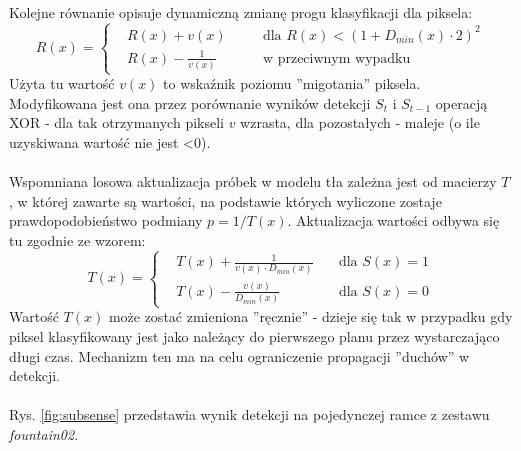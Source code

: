 \paragraph{}
Kolejne równanie opisuje dynamiczną zmianę progu klasyfikacji dla piksela:
\begin{equation}
R(x) = \left\{
\begin{split}
&R(x) + v(x) & \quad &\text{dla $R(x)<(1+D_{min}(x)\cdot 2)^2$} \\
&R(x) - \frac{1}{v(x)} & \quad &\text{w przeciwnym wypadku}
\end{split}
\right.
\end{equation}
Użyta tu wartość $v(x)$ to wskaźnik poziomu ''migotania'' piksela. Modyfikowana jest ona przez porównanie wyników detekcji $S_{t}$ i $S_{t-1}$ operacją XOR - dla tak otrzymanych pikseli $v$ wzrasta, dla pozostałych - maleje (o ile uzyskiwana wartość nie jest <0). 
\paragraph{}
Wspomniana losowa aktualizacja próbek w modelu tła zależna jest od macierzy $T$, w której zawarte są wartości, na podstawie których wyliczone zostaje prawdopodobieństwo podmiany $p = 1/T(x)$. Aktualizacja wartości odbywa się tu zgodnie ze wzorem:
\begin{equation}
T(x) = \left\{
\begin{split}
&T(x) + \frac{1}{v(x)\cdot D_{min}(x)} & \quad \text{dla $S(x)=1$} \\
&T(x) - \frac{v(x)}{D_{min}(x)} & \quad \text{dla $S(x)=0$}
\end{split}
\right.
\end{equation}
Wartość $T(x)$ może zostać zmieniona ''ręcznie'' - dzieje się tak w przypadku gdy piksel klasyfikowany jest jako należący do pierwszego planu przez wystarczająco długi czas. Mechanizm ten ma na celu ograniczenie propagacji ''duchów'' w detekcji.
\\ \\
Rys. \ref{fig:subsense} przedstawia wynik detekcji na pojedynczej ramce z zestawu \textit{fountain02}.


